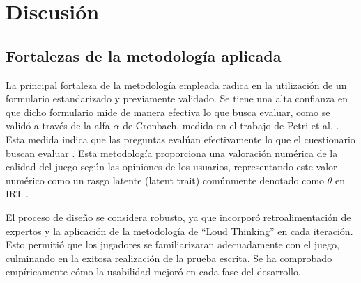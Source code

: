 \chapter{Discusión}



\section{Fortalezas de la metodología aplicada}

La principal fortaleza de la metodología empleada radica en la utilización de un formulario estandarizado y previamente validado. Se tiene una alta confianza en que dicho formulario mide de manera efectiva lo que busca evaluar, como se validó a través de la alfa $\alpha$ de Cronbach, medida en el trabajo de Petri et al. \cite{MeegaPlusManual}. Esta medida indica que las preguntas evalúan efectivamente lo que el cuestionario buscan evaluar \cite{MeegaPlusManual}. Esta metodología proporciona una valoración numérica de la calidad del juego según las opiniones de los usuarios, representando este valor numérico como un rasgo latente (latent trait) comúnmente denotado como $\theta$ en IRT \cite{maldonado2021statistical, RashMeasurementTheoryAndrichMarais}.

El proceso de diseño se considera robusto, ya que incorporó retroalimentación de expertos y la aplicación de la metodología de ``Loud Thinking'' en cada iteración. Esto permitió que los jugadores se familiarizaran adecuadamente con el juego, culminando en la exitosa realización de la prueba escrita. Se ha comprobado empíricamente cómo la usabilidad mejoró en cada fase del desarrollo.

